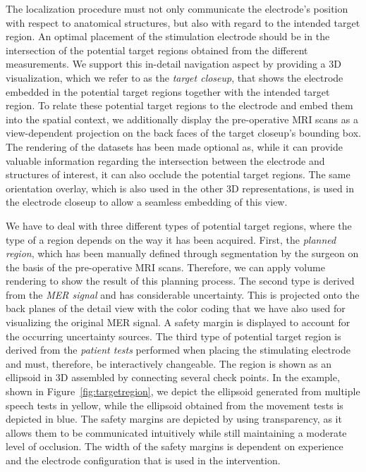 \documentclass{vgtc}                          %
\begin{document}
The localization procedure must not only communicate the electrode's position with respect to anatomical structures, but also with regard to the intended target region. An optimal placement of the stimulation electrode should be in the intersection of the potential target regions obtained from the different measurements. We support this in-detail navigation aspect by providing a 3D visualization, which we refer to as the \emph{target closeup}, that shows the electrode embedded in the potential target regions together with the intended target region. To relate these potential target regions to the electrode and embed them into the spatial context, we additionally display the pre-operative MRI scans as a view-dependent projection on the back faces of the target closeup's bounding box. The rendering of the datasets has been made optional as, while it can provide valuable information regarding the intersection between the electrode and structures of interest, it can also occlude the potential target regions. The same orientation overlay, which is also used in the other 3D representations, is used in the electrode closeup to allow a seamless embedding of this view.

We have to deal with three different types of potential target regions, where the type of a region depends on the way it has been acquired. First, the \emph{planned region}, which has been manually defined through segmentation by the surgeon on the basis of the pre-operative MRI scans. Therefore, we can apply volume rendering to show the result of this planning process. The second type is derived from the \emph{MER signal} and has considerable uncertainty. This is projected onto the back planes of the detail view with the color coding that we have also used for visualizing the original MER signal. A safety margin is displayed to account for the occurring uncertainty sources. The third type of potential target region is derived from the \emph{patient tests} performed when placing the stimulating electrode and must, therefore, be interactively changeable. The region is shown as an ellipsoid in 3D assembled by connecting several check points. In the example, shown in Figure~\ref{fig:targetregion}, we depict the ellipsoid generated from multiple speech tests in yellow, while the ellipsoid obtained from the movement tests is depicted in blue. The safety margins are depicted by using transparency, as it allows them to be communicated intuitively while still maintaining a moderate level of occlusion. The width of the safety margins is dependent on experience and the electrode configuration that is used in the intervention.
\end{document}
